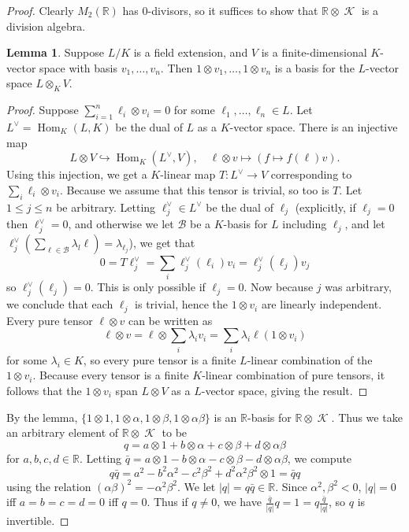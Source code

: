 \documentclass{article}
\theoremstyle{customplain}
\theoremstyle{customdef}
\newcommand{\R}{\mathbb{R}}
\newcommand{\calB}{\mathcal{B}}
\DeclareMathOperator{\Hom}{\mathrm{Hom}}
\DeclareMathOperator{\calK}{\mathcal{K}}
\theoremstyle{definition} %
\newtheorem*{lemma*}{Lemma}
\renewcommand{\le}{\leqslant}
\begin{document}
\begin{proof}
    Clearly $M_2(\R)$ has 0-divisors, so it suffices to show that $\R \otimes \calK$ is a division algebra. \begin{lemma*}
    Suppose $L/K$ is a field extension, and $V$ is a finite-dimensional $K$-vector space with basis $v_1, \dots, v_n$. Then $1\otimes v_1, \dots, 1\otimes v_n $ is a basis for the $L$-vector space $L\otimes_K V.$
\end{lemma*}
\begin{proof}
    Suppose $\sum_{i=1}^n \ell_i \otimes v_i = 0$ for some $\ell_1, \dots, \ell_n \in L.$ Let $L^\vee=\Hom_K(L,K)$ be the dual of $L$ as a $K$-vector space. There is an injective map
    \[
    L\otimes V \hookrightarrow \Hom_K(L^\vee, V), \quad \ell \otimes v \mapsto (f\mapsto f(\ell) v).
    \]
    Using this injection, we get a $K$-linear map $T:L^\vee \to V$ corresponding to $\sum_i \ell_i \otimes v_i.$ Because we assume that this tensor is trivial, so too is $T.$ Let $1\le j\le n$ be arbitrary. Letting $\ell_j^\vee\in L^\vee$ be the dual of $\ell_j$ (explicitly, if $\ell_j=0$ then $\ell_j^\vee = 0$, and otherwise we let $\calB$ be a $K$-basis for $L$ including $\ell_j$, and let $\ell_j^\vee( \sum_{\ell \in \calB} \lambda_l \ell)=\lambda_{\ell_j}$), we get that
    \[
    0=T\ell_j^\vee = \sum_i \ell_j^\vee(\ell_i) v_i= \ell_j^\vee(\ell_j) v_j
    \]
    so $\ell_j^\vee(\ell_j)=0.$ This is only possible if $\ell_j=0$. Now because $j$ was arbitrary, we conclude that each $\ell_j$ is trivial, hence the $1\otimes v_i$ are linearly independent. Every pure tensor $\ell \otimes v$ can be written as
    \[
    \ell \otimes v = \ell \otimes \sum_i \lambda_i v_i = \sum_i \lambda_i \ell (1 \otimes v_i)
    \]
    for some $\lambda_i \in K$, so every pure tensor is a finite $L$-linear combination of the $1\otimes v_i.$ Because every tensor is a finite $K$-linear combination of pure tensors, it follows that the $1\otimes v_i$ span $L\otimes V$ as a $L$-vector space, giving the result.
\end{proof}
    By the lemma, $\{1\otimes 1, 1 \otimes \alpha, 1 \otimes \beta, 1 \otimes \alpha \beta\}$ is an $\R$-basis for $\R \otimes \calK.$ Thus we take an arbitrary element of $\R \otimes \calK$ to be 
    \[
    q=a\otimes 1 + b\otimes \alpha+c\otimes \beta+d\otimes \alpha \beta
    \]
    for $a,b,c,d\in \R.$ Letting $\bar q = a\otimes 1 - b\otimes \alpha - c\otimes \beta - d\otimes \alpha \beta$, we compute
    \[
    q \bar q = a^2-b^2\alpha^2-c^2\beta^2+d^2 \alpha^2 \beta^2 \otimes 1 = \bar q q
    \]
    using the relation $(\alpha\beta)^2 = -\alpha^2 \beta^2.$ We let $|q|=q\bar q \in \R.$ Since $\alpha^2, \beta^2<0$, $|q| = 0$ iff $a=b=c=d=0$ iff $q=0$. Thus if $q\ne 0$, we have $\frac{\bar q}{|q|} q = 1 = q \frac{\bar q}{|q|}$, so $q$ is invertible.
\end{proof}
\end{document}
